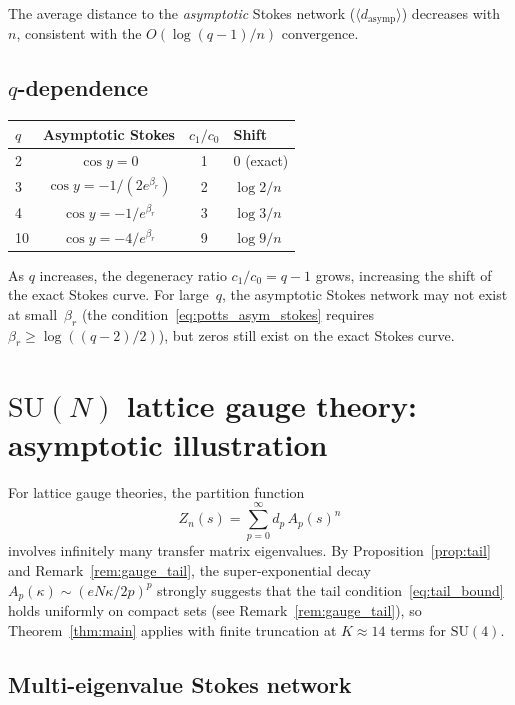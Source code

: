 \documentclass[12pt]{article}
\theoremstyle{definition}
\theoremstyle{remark}
\newcommand{\SU}{\mathrm{SU}}
\newcommand{\avg}[1]{\langle #1 \rangle}
\begin{document}
The average distance to the \emph{asymptotic} Stokes network
($\avg{d_{\text{asymp}}}$) decreases with $n$, consistent with the
$O(\log(q{-}1)/n)$ convergence.

\subsection{$q$-dependence}

\begin{center}
\begin{tabular}{lccl}
\toprule
$q$ & Asymptotic Stokes & $c_1/c_0$ & Shift \\
\midrule
2 & $\cos y = 0$ & 1 & 0 (exact) \\
3 & $\cos y = -1/(2e^{\beta_r})$ & 2 & $\log 2/n$ \\
4 & $\cos y = -1/e^{\beta_r}$ & 3 & $\log 3/n$ \\
10 & $\cos y = -4/e^{\beta_r}$ & 9 & $\log 9/n$ \\
\bottomrule
\end{tabular}
\end{center}

As $q$ increases, the degeneracy ratio $c_1/c_0 = q - 1$ grows,
increasing the shift of the exact Stokes curve.  For large~$q$, the
asymptotic Stokes network may not exist at small~$\beta_r$
(the condition~\eqref{eq:potts_asym_stokes} requires
$\beta_r \geq \log((q-2)/2)$), but zeros still exist on the
exact Stokes curve.


\section{$\SU(N)$ lattice gauge theory: asymptotic illustration}
\label{sec:sun}

For lattice gauge theories, the partition function
\[
Z_n(s) = \sum_{p=0}^{\infty} d_p\, A_p(s)^n
\]
involves infinitely many transfer matrix eigenvalues.
By Proposition~\ref{prop:tail} and Remark~\ref{rem:gauge_tail},
the super-exponential decay $A_p(\kappa) \sim (eN\kappa/2p)^p$
strongly suggests that the tail condition~\eqref{eq:tail_bound}
holds uniformly on compact sets (see Remark~\ref{rem:gauge_tail}),
so Theorem~\ref{thm:main} applies with finite
truncation at $K \approx 14$ terms for $\SU(4)$.

\subsection{Multi-eigenvalue Stokes network}
\end{document}
